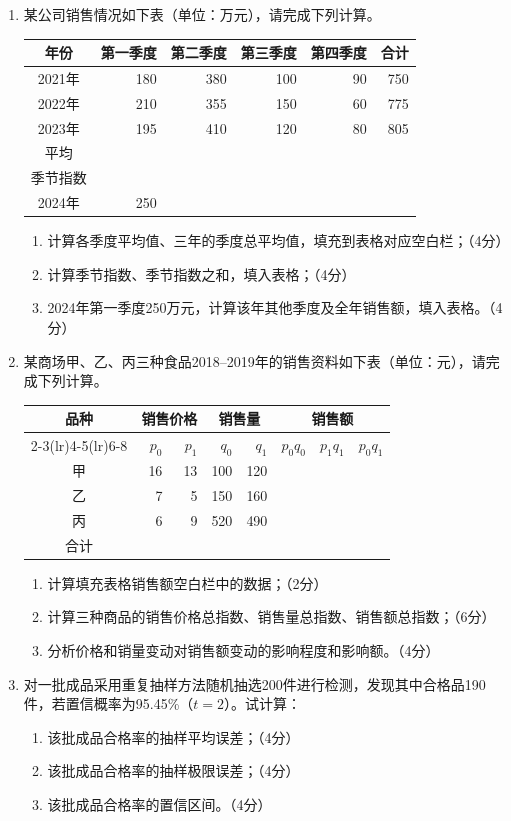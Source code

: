\documentclass[UTF8,a4paper,10pt]{ctexart}
\begin{document}
\begin{enumerate}[start=26]
\item 某公司销售情况如下表（单位：万元），请完成下列计算。
\begin{center}\begin{tabular}{crrrrr}\toprule 年份&第一季度&第二季度&第三季度&第四季度&合计\\\midrule2021年&180&380&100&90&750\\2022年&210&355&150&60&775\\2023年&195&410&120&80&805\\平均&&&&&\\季节指数&&&&&\\2024年&250&&&&\\\bottomrule\end{tabular}\end{center}
\begin{enumerate}[label=（\arabic*）,leftmargin=2.8em]\item 计算各季度平均值、三年的季度总平均值，填充到表格对应空白栏；（4分）\item 计算季节指数、季节指数之和，填入表格；（4分）\item 2024年第一季度250万元，计算该年其他季度及全年销售额，填入表格。（4分）\end{enumerate}
\item 某商场甲、乙、丙三种食品2018--2019年的销售资料如下表（单位：元），请完成下列计算。
\begin{center}\begin{tabular}{crrrrrrr}\toprule\multirow{2}{*}{品种}&\multicolumn{2}{c}{销售价格}&\multicolumn{2}{c}{销售量}&\multicolumn{3}{c}{销售额}\\\cmidrule(lr){2-3}\cmidrule(lr){4-5}\cmidrule(lr){6-8}&$p_0$&$p_1$&$q_0$&$q_1$&$p_0q_0$&$p_1q_1$&$p_0q_1$\\\midrule 甲&16&13&100&120&&&\\乙&7&5&150&160&&&\\丙&6&9&520&490&&&\\合计&&&&&&&\\\bottomrule\end{tabular}\end{center}
\begin{enumerate}[label=（\arabic*）,leftmargin=2.8em]\item 计算填充表格销售额空白栏中的数据；（2分）\item 计算三种商品的销售价格总指数、销售量总指数、销售额总指数；（6分）\item 分析价格和销量变动对销售额变动的影响程度和影响额。（4分）\end{enumerate}
\item 对一批成品采用重复抽样方法随机抽选200件进行检测，发现其中合格品190件，若置信概率为95.45\%（$t=2$）。试计算：
\begin{enumerate}[label=（\arabic*）,leftmargin=2.8em]\item 该批成品合格率的抽样平均误差；（4分）\item 该批成品合格率的抽样极限误差；（4分）\item 该批成品合格率的置信区间。（4分）\end{enumerate}
\end{enumerate}
\end{document}
